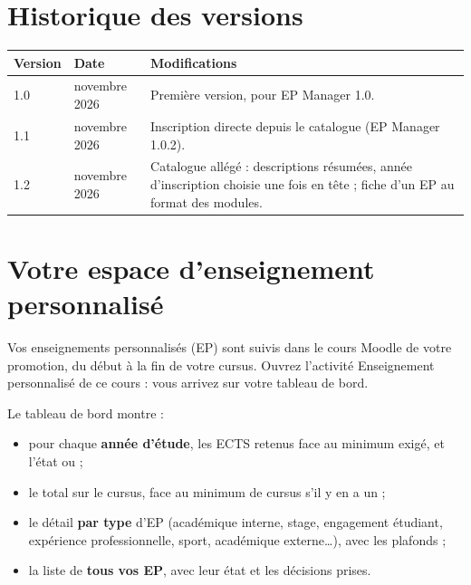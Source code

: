 \documentclass[11pt,a4paper]{article}
\begin{document}

\tableofcontents

\section*{Historique des versions}

\begin{center}
\begin{tabularx}{\linewidth}{@{}l l X@{}}
\toprule
\textbf{Version} & \textbf{Date} & \textbf{Modifications} \\
\midrule
1.0 & novembre 2026 & Première version, pour EP Manager 1.0. \\
1.1 & novembre 2026 & Inscription directe depuis le catalogue (EP Manager 1.0.2). \\
1.2 & novembre 2026 & Catalogue allégé : descriptions résumées, année d'inscription choisie une fois en tête ; fiche d'un EP au format des modules. \\
\bottomrule
\end{tabularx}
\end{center}

\newpage

\section{Votre espace d'enseignement personnalisé}

Vos enseignements personnalisés (EP) sont suivis dans le cours Moodle de votre promotion, du
début à la fin de votre cursus. Ouvrez l'activité \og Enseignement personnalisé\fg{} de ce
cours : vous arrivez sur votre tableau de bord.


Le tableau de bord montre :
\begin{itemize}
  \item pour chaque \textbf{année d'étude}, les ECTS retenus face au minimum exigé, et l'état
     ou  ;
  \item le total sur le cursus, face au minimum de cursus s'il y en a un ;
  \item le détail \textbf{par type} d'EP (académique interne, stage, engagement étudiant,
    expérience professionnelle, sport, académique externe\dots), avec les plafonds ;
  \item la liste de \textbf{tous vos EP}, avec leur état et les décisions prises.
\end{itemize}
\end{document}
